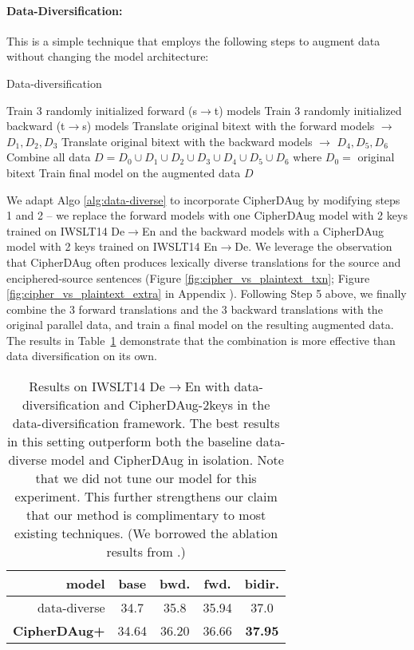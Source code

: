 \documentclass[11pt]{article}
\begin{document}
\paragraph{Data-Diversification:} This is a simple technique that employs the following steps to augment data without changing the model architecture:

\begin{algorithm}
\footnotesize
\caption{Data-diversification}\label{alg:data-diverse}

\begin{algorithmic}[1]
    \State Train 3 randomly initialized forward (s$\rightarrow$t) models
    \State Train 3 randomly initialized backward (t$\rightarrow$s) models
    \State Translate original bitext with the forward models $\rightarrow$ $D_1, D_2, D_3$ 
    \State Translate original bitext with the backward models $\rightarrow$ $D_4, D_5, D_6$
    \State Combine all data $D = D_0 \cup D_1 \cup D_2 \cup D_3 \cup D_4 \cup D_5 \cup D_6$ where $D_0 = $ original bitext
    \State Train final model on the augmented data $D$
\end{algorithmic}
\end{algorithm}


We adapt Algo \ref{alg:data-diverse} to incorporate CipherDAug by modifying steps 1 and 2 -- we replace the forward models with one CipherDAug model with 2 keys trained on IWSLT14 De$\rightarrow$En and the backward models with a CipherDAug model with 2 keys trained on IWSLT14 En$\rightarrow$De. We leverage the observation that CipherDAug often produces lexically diverse translations for the source and enciphered-source sentences (Figure \ref{fig:cipher_vs_plaintext_txn}; Figure \ref{fig:cipher_vs_plaintext_extra} in Appendix ). Following Step 5 above, we finally combine the 3 forward translations and the 3 backward translations with the original parallel data, and train a final model on the resulting augmented data. The results in Table~\ref{tab:data_diverse_compare} demonstrate that the combination is more effective than data diversification on its own.

\begin{table}[ht]
\small
\centering
\begin{tabular}{rcccc}
\toprule
\textbf{model} & \textbf{base} & \textbf{bwd.} & \textbf{fwd.} & \textbf{bidir.} \\ \midrule
data-diverse & 34.7 & 35.8 & 35.94 & 37.0 \\
\textbf{CipherDAug+} & 34.64 & 36.20 & 36.66 & \textbf{37.95} \\
\bottomrule
\end{tabular}
\caption{Results on IWSLT14 De$\rightarrow$En with data-diversification and CipherDAug-2keys in the data-diversification framework. The best results in this setting outperform both the baseline data-diverse model and CipherDAug in isolation. Note that we did not tune our model for this experiment. This further strengthens our claim that our method is complimentary to most existing techniques. (We borrowed the ablation results from \citet{nguyen19datadiverse}.)}
\label{tab:data_diverse_compare}
\end{table}
\end{document}
